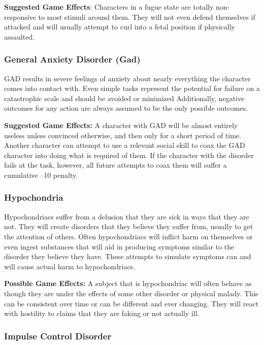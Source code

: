 \textbf{Suggested Game Effects}: Characters in a fugue state 
are totally non-responsive to most stimuli around 
them. They will not even defend themselves if attacked
and will usually attempt to curl into a fetal
position if physically assaulted.

\subsubsection{General Anxiety Disorder (Gad)}

GAD results in severe feelings of anxiety about nearly 
everything the character comes into contact with. 
Even simple tasks represent the potential for failure 
on a catastrophic scale and should be avoided or minimized
Additionally, negative outcomes for any action
are always assumed to be the only possible outcomes.

\textbf{Suggested Game Effects: }A character with GAD will 
be almost entirely useless unless convinced otherwise, 
and then only for a short period of time. Another 
character can attempt to use a relevant social skill to 
coax the GAD character into doing what is required 
of them. If the character with the disorder fails at the 
task, however, all future attempts to coax them will 
suffer a cumulative –10 penalty.

\subsubsection{Hypochondria}

Hypochondriacs suffer from a delusion that they are 
sick in ways that they are not. They will create disorders
that they believe they suffer from, usually to
get the attention of others. Often hypochondriacs will 
inflict harm on themselves or even ingest substances 
that will aid in producing symptoms similar to the 
disorder they believe they have. These attempts to 
simulate symptoms can and will cause actual harm to 
hypochondriacs.

\textbf{Possible Game Effects: }A subject that is hypochondriac
will often behave as though they are under the
effects of some other disorder or physical malady. 
This can be consistent over time or can be different 
and ever changing. They will react with hostility to 
claims that they are faking or not actually ill.

\subsubsection{Impulse Control Disorder}

